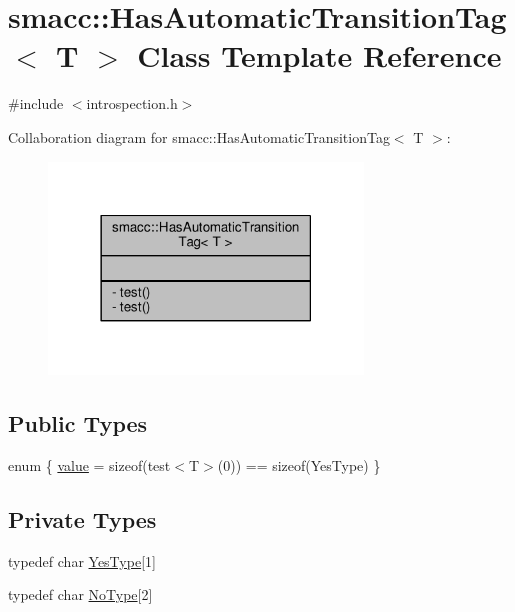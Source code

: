 \hypertarget{classsmacc_1_1HasAutomaticTransitionTag}{}\section{smacc\+:\+:Has\+Automatic\+Transition\+Tag$<$ T $>$ Class Template Reference}
\label{classsmacc_1_1HasAutomaticTransitionTag}


{\ttfamily \#include $<$introspection.\+h$>$}



Collaboration diagram for smacc\+:\+:Has\+Automatic\+Transition\+Tag$<$ T $>$\+:
\nopagebreak
\begin{figure}[H]
\begin{center}
\leavevmode
\includegraphics[width=237pt]{classsmacc_1_1HasAutomaticTransitionTag__coll__graph}
\end{center}
\end{figure}
\subsection*{Public Types}
\begin{DoxyCompactItemize}
\item 
enum \{ \hyperlink{classsmacc_1_1HasAutomaticTransitionTag_a129d2cfdc3c2071feb6eed2f328e77deac3cf7791b7f6bf4d5f4c7a93de7624a8}{value} = sizeof(test$<$T$>$(0)) == sizeof(Yes\+Type)
 \}
\end{DoxyCompactItemize}
\subsection*{Private Types}
\begin{DoxyCompactItemize}
\item 
typedef char \hyperlink{classsmacc_1_1HasAutomaticTransitionTag_ad3b0dca13c15ca18d97bbfa0f613614c}{Yes\+Type}\mbox{[}1\mbox{]}
\item 
typedef char \hyperlink{classsmacc_1_1HasAutomaticTransitionTag_adf9d68b94f123045a71e9a8ee31a5aa6}{No\+Type}\mbox{[}2\mbox{]}
\end{DoxyCompactItemize}
